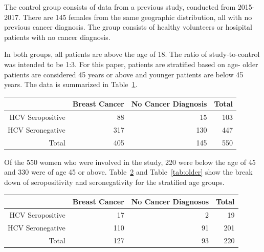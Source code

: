 \documentclass[12pt, titlepage]{article}
\begin{document}
The control group consists of 
data from a previous study, conducted from 2015-2017. There are 145 
females from the same geographic distribution, all with no previous 
cancer diagnosis. The group consists of healthy volunteers or hosipital
patients with no cancer diagnosis. 

In both groups, all patients are above the age of 
18. The ratio of study-to-control was intended to be 1:3.
For this paper, patients are stratified based on age- older patients 
are considered 45 years or above and younger patients are below 45 years. 
The data is summarized in Table~\ref{tab:all}. 


\begin{table}[!h]
  \begin{center}
\label{tab:all}
\begin{tabular}{rrrr}
  \toprule
  & Breast Cancer & No Cancer Diagnosis & Total\\ 
  \midrule
  HCV Seropositive & 88 & 15 & 103 \\ 
  HCV Seronegative & 317 & 130 & 447 \\ 
  \midrule
  Total & 405 & 145 & 550 \\ 
  \bottomrule
\end{tabular}
\end{center}
\end{table}
 

\begin{table}[!h]
  \begin{doublespace}
    Of the 550 women who were involved in the study, 220 were below 
the age of 45 and 330 were of age 45 or above. Table~\ref{tab:younger} 
and Table~\ref{tab:older} show the break down of seropositivity and 
seronegativity for the stratified age groups.
  \end{doublespace}
  \begin{center}
\label{tab:younger}
\begin{tabular}{rrrr}
  \toprule
  & Breast Cancer & No Cancer Diagnosos & Total\\
  \midrule
  HCV Seropositive & 17 & 2 & 19 \\ 
  HCV Seronegative & 110 & 91 & 201 \\ 
  \midrule
  Total & 127 & 93 & 220 \\ 
  \bottomrule
\end{tabular}
\end{center}
\end{table}
\end{document}
